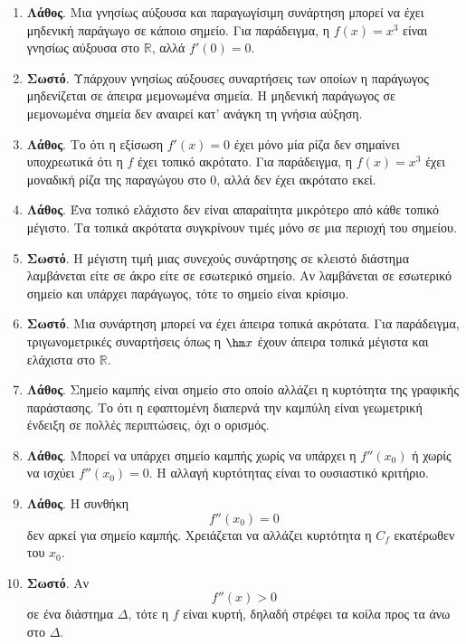 \begin{enumerate}[label=\textbf{2.\arabic*.}]
\item \textbf{Λάθος}. Μια γνησίως αύξουσα και παραγωγίσιμη συνάρτηση μπορεί να έχει μηδενική παράγωγο σε κάποιο σημείο. Για παράδειγμα, η $f(x)=x^3$ είναι γνησίως αύξουσα στο $\mathbb{R}$, αλλά $f'(0)=0$.

\item \textbf{Σωστό}. Υπάρχουν γνησίως αύξουσες συναρτήσεις των οποίων η παράγωγος μηδενίζεται σε άπειρα μεμονωμένα σημεία. Η μηδενική παράγωγος σε μεμονωμένα σημεία δεν αναιρεί κατ' ανάγκη τη γνήσια αύξηση.

\item \textbf{Λάθος}. Το ότι η εξίσωση $f'(x)=0$ έχει μόνο μία ρίζα δεν σημαίνει υποχρεωτικά ότι η $f$ έχει τοπικό ακρότατο. Για παράδειγμα, η $f(x)=x^3$ έχει μοναδική ρίζα της παραγώγου στο $0$, αλλά δεν έχει ακρότατο εκεί.

\item \textbf{Λάθος}. Ένα τοπικό ελάχιστο δεν είναι απαραίτητα μικρότερο από κάθε τοπικό μέγιστο. Τα τοπικά ακρότατα συγκρίνουν τιμές μόνο σε μια περιοχή του σημείου.

\item \textbf{Σωστό}. Η μέγιστη τιμή μιας συνεχούς συνάρτησης σε κλειστό διάστημα λαμβάνεται είτε σε άκρο είτε σε εσωτερικό σημείο. Αν λαμβάνεται σε εσωτερικό σημείο και υπάρχει παράγωγος, τότε το σημείο είναι κρίσιμο.

\item \textbf{Σωστό}. Μια συνάρτηση μπορεί να έχει άπειρα τοπικά ακρότατα. Για παράδειγμα, τριγωνομετρικές συναρτήσεις όπως η $\hm x$ έχουν άπειρα τοπικά μέγιστα και ελάχιστα στο $\mathbb{R}$.

\item \textbf{Λάθος}. Σημείο καμπής είναι σημείο στο οποίο αλλάζει η κυρτότητα της γραφικής παράστασης. Το ότι η εφαπτομένη διαπερνά την καμπύλη είναι γεωμετρική ένδειξη σε πολλές περιπτώσεις, όχι ο ορισμός.

\item \textbf{Λάθος}. Μπορεί να υπάρχει σημείο καμπής χωρίς να υπάρχει η $f''(x_0)$ ή χωρίς να ισχύει $f''(x_0)=0$. Η αλλαγή κυρτότητας είναι το ουσιαστικό κριτήριο.

\item \textbf{Λάθος}. Η συνθήκη
\[
f''(x_0)=0
\]
δεν αρκεί για σημείο καμπής. Χρειάζεται να αλλάζει κυρτότητα η $C_f$ εκατέρωθεν του $x_0$.

\item \textbf{Σωστό}. Αν
\[
f''(x)>0
\]
σε ένα διάστημα $\varDelta$, τότε η $f$ είναι κυρτή, δηλαδή στρέφει τα κοίλα προς τα άνω στο $\varDelta$.


\end{enumerate}
